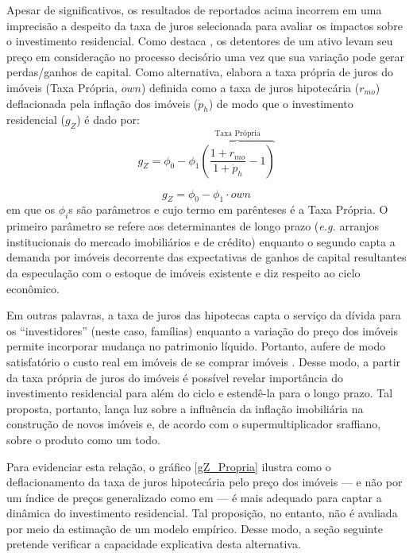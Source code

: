 Apesar de significativos, os resultados  de \textcite{huang_is_2018} reportados acima incorrem em uma imprecisão a despeito da taxa de juros selecionada para avaliar os impactos sobre o investimento residencial. Como destaca \textcite[p.~53]{teixeira_crescimento_2015}, os detentores de um ativo levam seu preço em consideração no processo decisório uma vez que sua variação pode gerar perdas/ganhos de capital. Como alternativa, elabora a taxa própria de juros do imóveis (Taxa Própria, $own$) definida como a taxa de juros hipotecária ($r_{mo}$) deflacionada pela inflação dos imóveis ({$\dot p_h$}) de modo que o investimento residencial ($g_Z$) é dado por:
$$
g_Z = \phi_0 - \phi_1 \overbrace{\left(\frac{1+r_{mo}}{1+\dot p_h} - 1\right)}^{\text{Taxa Própria}}
$$

\begin{equation}
g_Z = \phi_0 - \phi_1\cdot own
\end{equation}
em que os $\phi_i$s são parâmetros e cujo termo em parênteses é a Taxa Própria. 
O primeiro parâmetro se refere aos determinantes de longo prazo (\textit{e.g.} arranjos institucionais do mercado imobiliários e de crédito) enquanto o segundo capta a demanda por imóveis decorrente das expectativas de ganhos de capital resultantes da especulação com o estoque de imóveis existente e diz respeito ao ciclo econômico.

Em outras palavras, a taxa de juros das hipotecas capta o serviço da dívida para os ``investidores'' (neste caso, famílias) enquanto a variação do preço dos imóveis permite incorporar mudança no patrimonio líquido. Portanto, aufere de modo satisfatório o custo real em imóveis de se comprar imóveis \cite[p.~53]{teixeira_crescimento_2015}. Desse modo, a partir da taxa própria de juros do imóveis é possível revelar importância do investimento residencial para além do ciclo e estendê-la para o longo prazo.  Tal proposta, portanto, lança luz sobre a influência da inflação imobiliária na construção de novos imóveis e, de acordo com o supermultiplicador sraffiano, sobre o produto como um todo. 


Para evidenciar esta relação, o gráfico \ref{gZ_Propria} ilustra como  o deflacionamento da taxa de juros hipotecária pelo preço dos imóveis --- e não por um índice de preços generalizado como em \textcite[p.~143--146]{fair_macroeconometric_2013} --- é mais adequado para captar a dinâmica do investimento residencial. Tal proposição, no entanto, não é avaliada por meio da estimação de um modelo empírico. Desse modo, a seção seguinte pretende verificar a capacidade explicativa desta alternativa.

